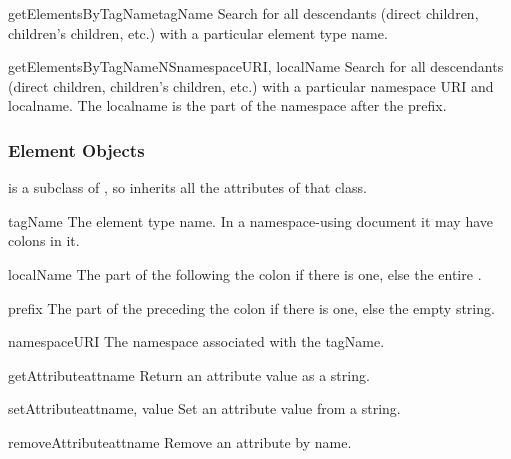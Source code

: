\begin{methoddesc}[Document]{getElementsByTagName}{tagName}
Search for all descendants (direct children, children's children,
etc.) with a particular element type name.
\end{methoddesc}

\begin{methoddesc}[Document]{getElementsByTagNameNS}{namespaceURI, localName}
Search for all descendants (direct children, children's children,
etc.) with a particular namespace URI and localname.  The localname is
the part of the namespace after the prefix.
\end{methoddesc}


\subsubsection{Element Objects \label{dom-element-objects}}

 is a subclass of , so inherits all the
attributes of that class.

\begin{memberdesc}[Element]{tagName}
The element type name.  In a namespace-using document it may have
colons in it.
\end{memberdesc}

\begin{memberdesc}[Element]{localName}
The part of the  following the colon if there is one,
else the entire .
\end{memberdesc}

\begin{memberdesc}[Element]{prefix}
The part of the  preceding the colon if there is one,
else the empty string.
\end{memberdesc}

\begin{memberdesc}[Element]{namespaceURI}
The namespace associated with the tagName.
\end{memberdesc}

\begin{methoddesc}[Element]{getAttribute}{attname}
Return an attribute value as a string.
\end{methoddesc}

\begin{methoddesc}[Element]{setAttribute}{attname, value}
Set an attribute value from a string.
\end{methoddesc}

\begin{methoddesc}[Element]{removeAttribute}{attname}
Remove an attribute by name.
\end{methoddesc}

